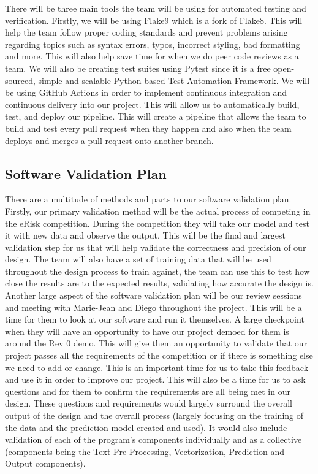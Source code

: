 \documentclass[12pt, titlepage]{article}
\begin{document}
  There will be three main tools the team will be using for automated testing and verification. Firstly, we will be using Flake9 which is a fork of Flake8. This will help the team follow proper coding standards and prevent problems arising regarding topics such as syntax errors, typos, incorrect styling, bad formatting and more. This will also help save time for when we do peer code reviews as a team. We will also be creating test suites using Pytest since it is a free open-sourced, simple and scalable Python-based Test Automation Framework. We will be using GitHub Actions in order to implement continuous integration and continuous delivery into our project. This will allow us to automatically build, test, and deploy our pipeline. This will create a pipeline that allows the team to build and test every pull request when they happen and also when the team deploys and merges a pull request onto another branch.
  
  \subsection{Software Validation Plan} \label{Software Validation Plan}
  
  There are a multitude of methods and parts to our software validation plan. Firstly, our primary validation method will be the actual process of competing in the eRisk competition. During the competition they will take our model and test it with new data and observe the output. This will be the final and largest validation step for us that will help validate the correctness and precision of our design. The team will also have a set of training data that will be used throughout the design process to train against, the team can use this to test how close the results are to the expected results, validating how accurate the design is. \\

  Another large aspect of the software validation plan will be our review sessions and meeting with Marie-Jean and Diego throughout the project. This will be a time for them to look at our software and run it themselves. A large checkpoint when they will have an opportunity to have our project demoed for them is around the Rev 0 demo. This will give them an opportunity to validate that our project passes all the requirements of the competition or if there is something else we need to add or change. This is an important time for us to take this feedback and use it in order to improve our project. This will also be a time for us to ask questions and for them to confirm the requirements are all being met in our design. These questions and requirements would largely surround the overall output of the design and the overall process (largely focusing on the training of the data and the prediction model created and used). It would also include validation of each of the program's components individually and as a collective (components being the Text Pre-Processing, Vectorization, Prediction and Output components). \\
\end{document}
